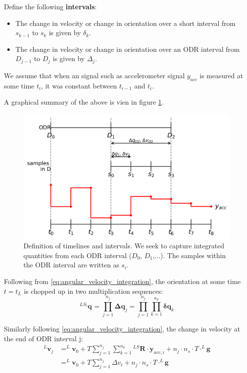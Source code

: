 \documentclass{article}
\begin{document}
Define the following \textbf{intervals}:
\begin{itemize}
\item The change in velocity or change in orientation over a short interval from $s_{k-1}$ to $s_k$ is given by $\delta_k$.
\item The change in velocity or change in orientation over an ODR interval from $D_{j-1}$ to $D_j$ is given by $\Delta_j$.
\end{itemize}

We assume that when an signal such as accelerometer signal $y_{acc}$ is measured at some time $t_i$, it was constant between $t_{i-1}$ and $t_i$.

A graphical summary of the above is vien in figure \ref{fig:strapdown_integration_timelines}.

\begin{figure}[ht]
\includegraphics[scale=.8]{strapdown_integration_timelines.png} 
\caption{Definition of timelines and intervals.  We seek to capture integrated quantities from each ODR interval ($D_0$, $D_1$,...). The samples within the ODR interval are written as $s_i$.}
\centering
\label{fig:strapdown_integration_timelines}
\end{figure}

Following from \ref{eq:angular_velocity_integration}, the orientation at some time $t=t_L$ is chopped up in two multiplication sequences:
\begin{equation} \label{eq:orientation_chopped_up}
^{LS_t}\textbf{q}_{} = \prod_{j=1}^{n_j}\boldsymbol{\Delta q}_j
= \prod_{j=1}^{n_j} \prod_{k=1}^{n_k} \boldsymbol{\delta q}_k
\end{equation}

Similarly following \ref{eq:angular_velocity_integration}, the change in velocity at the end of ODR interval j:
\begin{equation} \label{eq:acceleration_chopped_up}
\begin{aligned}
^L\textbf{v}_{j} &= ^L\textbf{v}_0 + T \sum_{j=1}^{n_j} \sum_{k=1}^{n_k} {}^{LS}\boldsymbol{R} \cdot \boldsymbol{y}_{acc,i} +n_{j} \cdot n_s \cdot T \cdot ^L\boldsymbol{g} \\ 
&=  ^L\textbf{v}_0 + T \sum_{j=1}^{n_j} \Delta v_t + n_{j} \cdot n_s \cdot T \cdot ^L\boldsymbol{g}
\end{aligned}
\end{equation}
\end{document}
